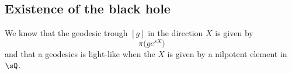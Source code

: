 \subsection{Existence of the black hole}
%
\label{LONGSubSecExistenceTrouNoir}

We know that the geodesic trough $[g]$ in the direction $X$ is given by
\begin{equation}
    \pi\big( g e^{sX} \big)
\end{equation}
and that a geodesics is light-like when the  $X$ is given by a nilpotent element in $\sQ$\cite{lcTNAdS}.


\newcommand{\CaptionFigDTIYKkP}{We are looking at a geodesics issued from one point of the line $[\SO(2)]=\{ e^{xq_0}\}_{x\in\mathopen[ 0 , 2\pi [}$. Here, $E(w)=q_0+w_1q_1+w_2q_2+\sum_{k\geq 3}w_kq_k$ with $\sum_{k}w_k^2=1$.}


